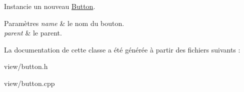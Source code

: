 Instancie un nouveau \hyperlink{classButton}{Button}. 


\begin{DoxyParams}{Paramètres}
{\em name} & le nom du bouton. \\
\hline
{\em parent} & le parent. \\
\hline
\end{DoxyParams}


La documentation de cette classe a été générée à partir des fichiers suivants \+:\begin{DoxyCompactItemize}
\item 
view/button.\+h\item 
view/button.\+cpp\end{DoxyCompactItemize}
